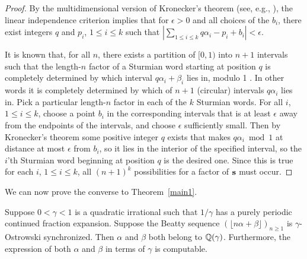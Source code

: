 \documentclass[12pt,reqno]{article}
\begin{document}
\begin{proof}
By the multidimensional version of Kronecker's theorem (see, e.g., 
\cite[Thm.~442]{Hardy&Wright:1985}), 
the linear independence criterion implies
that for $\epsilon>0$ and all choices of the $b_i$,
there exist integers $q$ and $p_i$, $1 \leq i\leq k$ such that
$|\sum_{1\leq i\leq k} q \alpha_i - p_i + b_i| < \epsilon$.

It is known that, for all $n$, there exists a partition of $[0,1)$ into
$n+1$ intervals such that the length-$n$ factor of a Sturmian word starting at position $q$ is completely determined by 
which interval
$q \alpha_i +\beta_i$ lies in, modulo 1 \cite{Knuth:1972}.   In other words it is completely determined
by which of $n+1$ (circular) intervals $q\alpha_i$ lies in. Pick a particular length-$n$ factor in each of the $k$ Sturmian words.   For all $i$, $1 \leq i\leq k$, choose a point $b_i$ in the
corresponding
intervals that is at least $\epsilon$ away from the endpoints of the intervals, and choose $\epsilon$ sufficiently small.
Then by Kronecker's theorem some positive integer $ q$ exists that makes $q \alpha_i\bmod 1$ at distance at most $\epsilon$
from $b_i$, so it lies in the interior of the specified interval, so the $i$'th Sturmian word
beginning at position $q$ is the desired one.     Since this is true for each $i$, $1 \leq i \leq k$,
all 
$(n+1)^k$ possibilities for a factor of $\bf s$ must occur. 
\end{proof}

We can now prove the converse to Theorem~\ref{main1}.

\begin{theorem}
Suppose $0 < \gamma < 1$ is a quadratic irrational such that
$1/\gamma$ has a purely periodic continued fraction expansion.  
  Suppose the Beatty sequence
  $(\lfloor n \alpha + \beta \rfloor)_{n \geq 1}$ is $\gamma$-Ostrowski synchronized.  Then
$\alpha$ and $\beta$ both belong to  $\mathbb{Q}(\gamma)$.
Furthermore, the expression of both $\alpha$ and $\beta$
in terms of $\gamma$ is computable.
\label{main1-converse}
\end{theorem}
\end{document}
